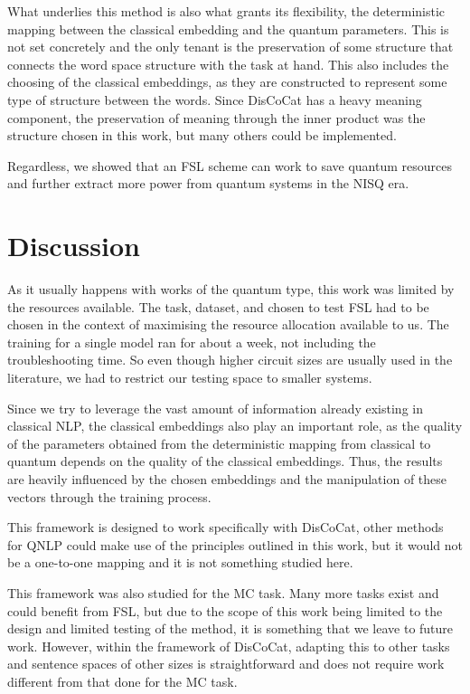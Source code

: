 What underlies this method is also what grants its flexibility, the deterministic mapping between the classical embedding and the quantum parameters. This is not set concretely and the only tenant is the preservation of some structure that connects the word space structure with the task at hand. This also includes the choosing of the classical embeddings, as they are constructed to represent some type of structure between the words. Since DisCoCat has a heavy meaning component, the preservation of meaning through the inner product was the structure chosen in this work, but many others could be implemented.

Regardless, we showed that an FSL scheme can work to save quantum resources and further extract more power from quantum systems in the NISQ era.

\section{Discussion}

As it usually happens with works of the quantum type, this work was limited by the resources available. The task, dataset, and \mya chosen to test FSL had to be chosen in the context of maximising the resource allocation available to us. The training for a single model ran for about a week, not including the troubleshooting time. So even though higher circuit sizes are usually used in the literature, we had to restrict our testing space to smaller systems.

Since we try to leverage the vast amount of information already existing in classical NLP, the classical embeddings also play an important role, as the quality of the parameters obtained from the deterministic mapping from classical to quantum depends on the quality of the classical embeddings. Thus, the results are heavily influenced by the chosen embeddings and the manipulation of these vectors through the training process.

This framework is designed to work specifically with DisCoCat, other methods for QNLP could make use of the principles outlined in this work, but it would not be a one-to-one mapping and it is not something studied here.

This framework was also studied for the MC task. Many more tasks exist and could benefit from FSL, but due to the scope of this work being limited to the design and limited testing of the method, it is something that we leave to future work. However, within the framework of DisCoCat, adapting this to other tasks and sentence spaces of other sizes is straightforward and does not require work different from that done for the MC task.

